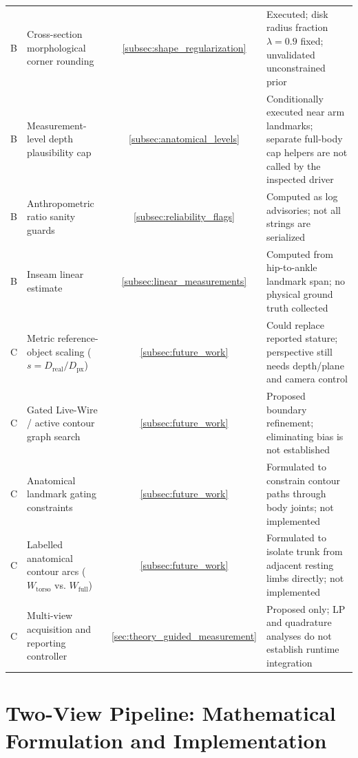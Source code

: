 \documentclass[journal]{IEEEtran}
\begin{document}
\begin{table}[!t]
\begin{tabular}{c p{5.5cm} c p{7.5cm}}
B & Cross-section morphological corner rounding & \ref{subsec:shape_regularization} & Executed; disk radius fraction $\lambda=0.9$ fixed; unvalidated unconstrained prior \\
B & Measurement-level depth plausibility cap & \ref{subsec:anatomical_levels} & Conditionally executed near arm landmarks; separate full-body cap helpers are not called by the inspected driver \\
B & Anthropometric ratio sanity guards & \ref{subsec:reliability_flags} & Computed as log advisories; not all strings are serialized \\
B & Inseam linear estimate & \ref{subsec:linear_measurements} & Computed from hip-to-ankle landmark span; no physical ground truth collected \\
\midrule
C & Metric reference-object scaling ($s = D_{\text{real}} / D_{\text{px}}$) & \ref{subsec:future_work} & Could replace reported stature; perspective still needs depth/plane and camera control \\
C & Gated Live-Wire / active contour graph search & \ref{subsec:future_work} & Proposed boundary refinement; eliminating bias is not established \\
C & Anatomical landmark gating constraints & \ref{subsec:future_work} & Formulated to constrain contour paths through body joints; not implemented \\
C & Labelled anatomical contour arcs ($W_{\text{torso}}$ vs. $W_{\text{full}}$) & \ref{subsec:future_work} & Formulated to isolate trunk from adjacent resting limbs directly; not implemented \\
C & Multi-view acquisition and reporting controller & \ref{sec:theory_guided_measurement} & Proposed only; LP and quadrature analyses do not establish runtime integration \\
\bottomrule
\end{tabular}
\end{table}

\section{Two-View Pipeline: Mathematical Formulation and Implementation}
\label{sec:system_pipeline}
\end{document}
